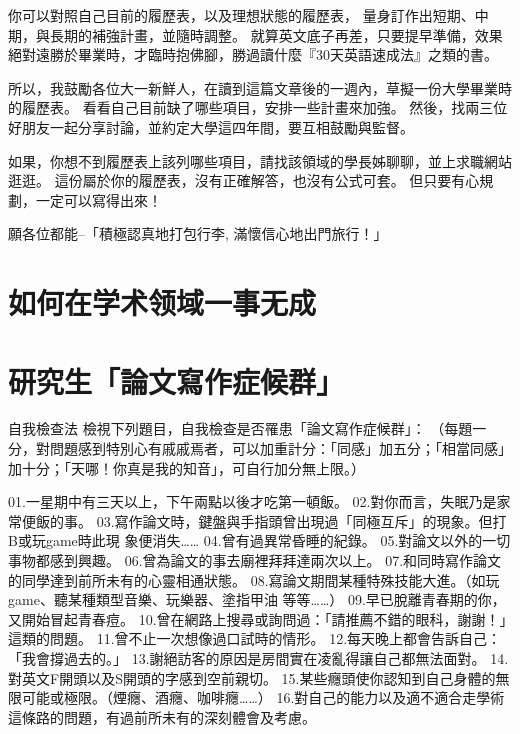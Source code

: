 你可以對照自己目前的履歷表，以及理想狀態的履歷表， 量身訂作出短期、中期，與長期的補強計畫，並隨時調整。 就算英文底子再差，只要提早準備，效果絕對遠勝於畢業時，才臨時抱佛腳，勝過讀什麼『30天英語速成法』之類的書。

所以，我鼓勵各位大一新鮮人，在讀到這篇文章後的一週內，草擬一份大學畢業時的履歷表。 看看自己目前缺了哪些項目，安排一些計畫來加強。 然後，找兩三位好朋友一起分享討論，並約定大學這四年間，要互相鼓勵與監督。

如果，你想不到履歷表上該列哪些項目，請找該領域的學長姊聊聊，並上求職網站逛逛。
這份屬於你的履歷表，沒有正確解答，也沒有公式可套。 但只要有心規劃，一定可以寫得出來！

願各位都能--「積極認真地打包行李, 滿懷信心地出門旅行！」


\section{如何在学术领域一事无成}



\section{研究生「論文寫作症候群」}

自我檢查法 
檢視下列題目，自我檢查是否罹患「論文寫作症候群」： 
（每題一分，對問題感到特別心有戚戚焉者，可以加重計分：「同感」加五分；「相當同感」加十分；「天哪！你真是我的知音」，可自行加分無上限。）

01.一星期中有三天以上，下午兩點以後才吃第一頓飯。
02.對你而言，失眠乃是家常便飯的事。
03.寫作論文時，鍵盤與手指頭曾出現過「同極互斥」的現象。但打B或玩game時此現 象便消失……
04.曾有過異常昏睡的紀錄。
05.對論文以外的一切事物都感到興趣。
06.曾為論文的事去廟裡拜拜達兩次以上。
07.和同時寫作論文的同學達到前所未有的心靈相通狀態。
08.寫論文期間某種特殊技能大進。（如玩game、聽某種類型音樂、玩樂器、塗指甲油 等等……）
09.早已脫離青春期的你，又開始冒起青春痘。 
10.曾在網路上搜尋或詢問過：「請推薦不錯的眼科，謝謝！」這類的問題。 
11.曾不止一次想像過口試時的情形。
12.每天晚上都會告訴自己：「我會撐過去的。」
13.謝絕訪客的原因是房間實在凌亂得讓自己都無法面對。
14.對英文F開頭以及S開頭的字感到空前親切。
15.某些癮頭使你認知到自己身體的無限可能或極限。（煙癮、酒癮、咖啡癮……）
16.對自己的能力以及適不適合走學術這條路的問題，有過前所未有的深刻體會及考慮。 

